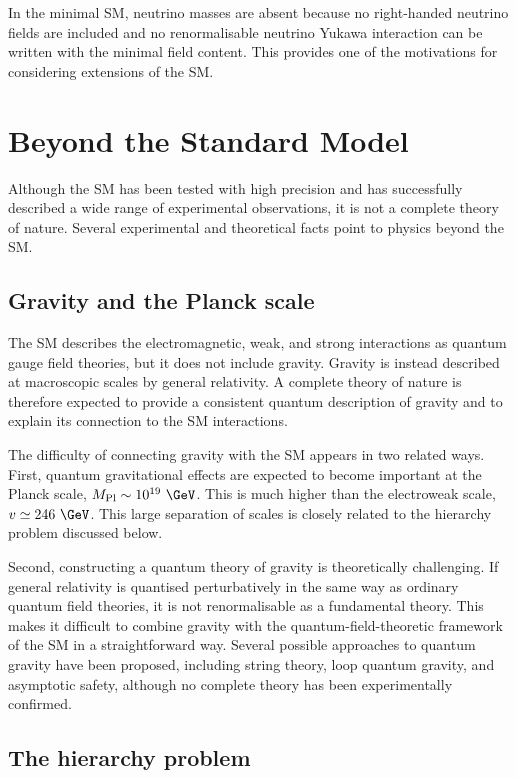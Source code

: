 In the minimal SM, neutrino masses are absent because no right-handed neutrino fields are included and no renormalisable neutrino Yukawa interaction can be written with the minimal field content. 
This provides one of the motivations for considering extensions of the SM.


\section{Beyond the Standard Model}
\label{sec:bsm}

Although the SM has been tested with high precision and has successfully described a wide range of experimental observations, it is not a complete theory of nature. 
Several experimental and theoretical facts point to physics beyond the SM.

\subsection{Gravity and the Planck scale}
\label{subsec:gravity_planck_scale}

The SM describes the electromagnetic, weak, and strong interactions as quantum gauge field theories, but it does not include gravity. 
Gravity is instead described at macroscopic scales by general relativity. 
A complete theory of nature is therefore expected to provide a consistent quantum description of gravity and to explain its connection to the SM interactions.

The difficulty of connecting gravity with the SM appears in two related ways. 
First, quantum gravitational effects are expected to become important at the Planck scale, $M_{\mathrm{Pl}}\sim10^{19}~\GeV$. This is much higher than the electroweak scale, $v\simeq246~\GeV$.
This large separation of scales is closely related to the hierarchy problem discussed below.

Second, constructing a quantum theory of gravity is theoretically challenging. 
If general relativity is quantised perturbatively in the same way as ordinary quantum field theories, it is not renormalisable as a fundamental theory. 
This makes it difficult to combine gravity with the quantum-field-theoretic framework of the SM in a straightforward way. 
Several possible approaches to quantum gravity have been proposed, including string theory, loop quantum gravity, and asymptotic safety, although no complete theory has been experimentally confirmed.

\subsection{The hierarchy problem}
\label{subsec:hierarchy_problem}

